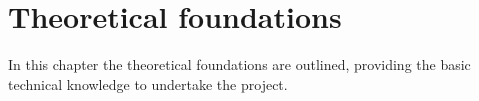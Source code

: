 %
\chapter{Theoretical foundations}
\label{ch:theor-found}
In this chapter the theoretical foundations are outlined,
providing the basic technical knowledge to undertake the project.
% 
















%
